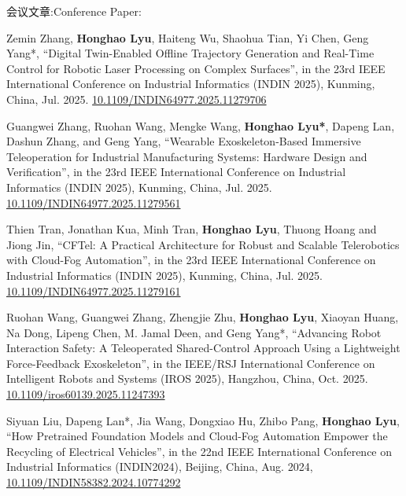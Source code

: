 \resumePOR{}
    {\ifchinese 会议文章:\else Conference Paper:\fi}
    {}
\resumeItemListStart
\begin{enumerate}[align=left, widest={[\textbf{S.1}]}, itemindent=0em, label={\textbf{[\arabic*]}]}]
    \item[\textbf{[C.21]}] Zemin Zhang, \textbf{Honghao Lyu}, Haiteng Wu, Shaohua Tian, Yi Chen, Geng Yang*, ``Digital Twin-Enabled Offline Trajectory Generation and Real-Time Control for Robotic Laser Processing on Complex Surfaces'', in the 23rd IEEE International Conference on Industrial Informatics (INDIN 2025), Kunming, China, Jul. 2025. \href{https://doi.org/10.1109/INDIN64977.2025.11279706}{10.1109/INDIN64977.2025.11279706}
    \item[\textbf{[C.20]}] Guangwei Zhang, Ruohan Wang, Mengke Wang, \textbf{Honghao Lyu*}, Dapeng Lan, Dashun Zhang, and Geng Yang, ``Wearable Exoskeleton-Based Immersive Teleoperation for Industrial Manufacturing Systems: Hardware Design and Verification'', in the 23rd IEEE International Conference on Industrial Informatics (INDIN 2025), Kunming, China, Jul. 2025. \href{https://doi.org/10.1109/INDIN64977.2025.11279561}{10.1109/INDIN64977.2025.11279561}
    \item[\textbf{[C.19]}] Thien Tran, Jonathan Kua, Minh Tran, \textbf{Honghao Lyu}, Thuong Hoang and Jiong Jin, ``CFTel: A Practical Architecture for Robust and Scalable Telerobotics with Cloud-Fog Automation'', in the 23rd IEEE International Conference on Industrial Informatics (INDIN 2025), Kunming, China, Jul. 2025. \href{https://doi.org/10.1109/INDIN64977.2025.11279161}{10.1109/INDIN64977.2025.11279161}
    \item[\textbf{[C.18]}] Ruohan Wang, Guangwei Zhang, Zhengjie Zhu, \textbf{Honghao Lyu}, Xiaoyan Huang, Na Dong, Lipeng Chen, M. Jamal Deen, and Geng Yang*, ``Advancing Robot Interaction Safety: A Teleoperated Shared-Control Approach Using a Lightweight Force-Feedback Exoskeleton'', in the IEEE/RSJ International Conference on Intelligent Robots and Systems (IROS 2025), Hangzhou, China, Oct. 2025. \href{https://doi.org/10.1109/iros60139.2025.11247393}{10.1109/iros60139.2025.11247393}
    \item[\textbf{[C.17]}] Siyuan Liu, Dapeng Lan*, Jia Wang, Dongxiao Hu, Zhibo Pang, \textbf{Honghao Lyu}, ``How Pretrained Foundation Models and Cloud-Fog Automation Empower the Recycling of Electrical Vehicles'', in the 22nd IEEE International Conference on Industrial Informatics (INDIN2024), Beijing, China, Aug. 2024, \href{https://doi.org/10.1109/INDIN58382.2024.10774292}{10.1109/INDIN58382.2024.10774292}

\end{enumerate}

